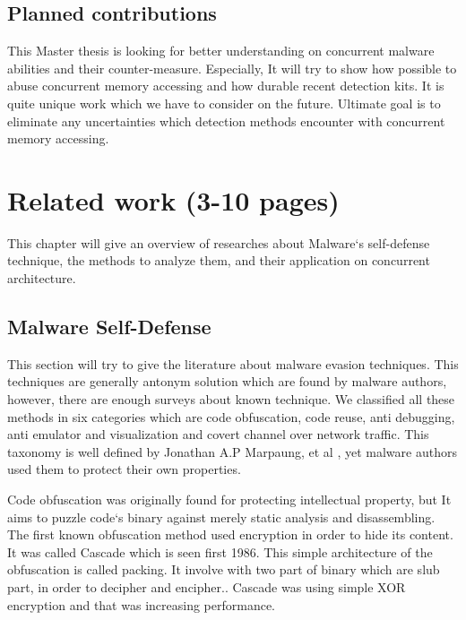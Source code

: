 \documentclass[informationsecurity]{gucmasterproject}
\begin{document}
\section{Planned contributions}
This Master thesis is looking for better understanding on concurrent malware abilities and their counter-measure. Especially, It will try to show how possible to abuse concurrent memory accessing and how durable recent detection kits. It is quite unique work which we have to consider on the future. Ultimate goal is to eliminate any uncertainties which detection methods encounter with concurrent memory accessing.

\chapter{Related work (3-10 pages)}
This chapter will give an overview of researches about Malware`s self-defense technique, the methods to analyze them, and their application on concurrent architecture. 

\section{Malware Self-Defense}
This section will try to give the literature about malware evasion techniques. This techniques are generally antonym solution which are found by malware authors, however, there are enough surveys about known technique. We classified all these methods in six categories which are code obfuscation, code reuse, anti debugging, anti emulator and visualization and covert channel over network traffic. This taxonomy is well defined by Jonathan A.P Marpaung, et al \cite{marpaung2012survey}, yet malware authors used them to protect their own properties. 


Code obfuscation was originally  found for protecting intellectual property\cite{balakrishnan2005code}, but It aims to puzzle code`s binary against merely static analysis and disassembling\cite{nachenberg1996understanding}. The first known obfuscation method used encryption in order to hide its content. It was called Cascade which is seen first 1986\cite{you2010malware}. This simple architecture of the obfuscation is called packing\cite{internotsecurityteam}. It involve with two part of binary which are slub part, in order to decipher and encipher.\cite{marpaung2012survey}. Cascade was using simple XOR encryption and that was increasing performance.
\end{document}

